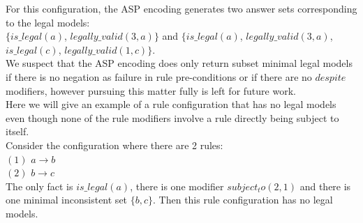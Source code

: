 For this configuration, the ASP encoding generates two answer sets corresponding to the legal models:\\
\newline
$\{is\_legal(a)$, $legally\_valid(3,a)\}$ and $\{is\_legal(a)$, $legally\_valid(3,a)$, $is\_legal(c)$, $legally\_valid(1,c)\}$.\\

We suspect that the ASP encoding does only return subset minimal legal models if there is no negation as failure in rule pre-conditions or if there are no $despite$ modifiers, however pursuing this matter fully is left for future work.\\

Here we will give an example of a rule configuration that has no legal models even though none of the rule modifiers involve a rule directly being subject to itself.\\

Consider the configuration where there are 2 rules:\\ $(1)$ $a\rightarrow b$\\
$(2)$ $b\rightarrow c$\\
The only fact is $is\_legal(a)$, there is one modifier $subject_to(2,1)$ and there is one minimal inconsistent set $\{b,c\}$. Then this rule configuration has no legal models. 





